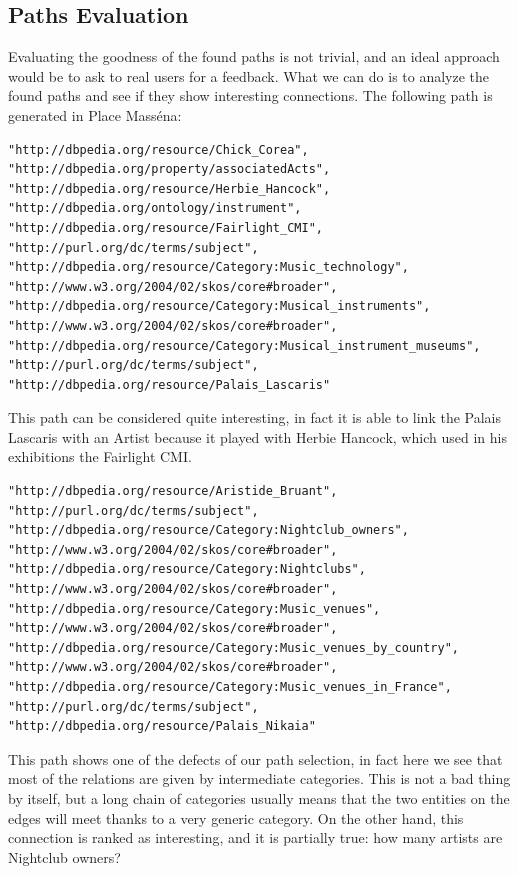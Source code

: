 \documentclass[paper=a4, fontsize=11pt]{scrartcl}
\begin{document}
\subsection{Paths Evaluation}
Evaluating the goodness of the found paths is not trivial, and an ideal approach would be to ask to real users for a feedback.
What we can do is to analyze the found paths and see if they show interesting connections.
The following path is generated in Place Masséna:
\begin{lstlisting}
"http://dbpedia.org/resource/Chick_Corea", 
"http://dbpedia.org/property/associatedActs", 
"http://dbpedia.org/resource/Herbie_Hancock", 
"http://dbpedia.org/ontology/instrument", 
"http://dbpedia.org/resource/Fairlight_CMI", 
"http://purl.org/dc/terms/subject", 
"http://dbpedia.org/resource/Category:Music_technology", 
"http://www.w3.org/2004/02/skos/core#broader", 
"http://dbpedia.org/resource/Category:Musical_instruments", 
"http://www.w3.org/2004/02/skos/core#broader",       
"http://dbpedia.org/resource/Category:Musical_instrument_museums", 
"http://purl.org/dc/terms/subject", 
"http://dbpedia.org/resource/Palais_Lascaris"
\end{lstlisting}
This path can be considered quite interesting, in fact it is able to link the Palais Lascaris with an Artist because it played with Herbie Hancock, which used in his exhibitions the Fairlight CMI.
\begin{lstlisting}
"http://dbpedia.org/resource/Aristide_Bruant", 
"http://purl.org/dc/terms/subject", 
"http://dbpedia.org/resource/Category:Nightclub_owners", 
"http://www.w3.org/2004/02/skos/core#broader", 
"http://dbpedia.org/resource/Category:Nightclubs", 
"http://www.w3.org/2004/02/skos/core#broader", 
"http://dbpedia.org/resource/Category:Music_venues", 
"http://www.w3.org/2004/02/skos/core#broader", 
"http://dbpedia.org/resource/Category:Music_venues_by_country", 
"http://www.w3.org/2004/02/skos/core#broader", 
"http://dbpedia.org/resource/Category:Music_venues_in_France", 
"http://purl.org/dc/terms/subject", 
"http://dbpedia.org/resource/Palais_Nikaia"
\end{lstlisting}
This path shows one of the defects of our path selection, in fact here we see that most of the relations are given by intermediate categories. This is not a bad thing by itself, but a long chain of categories usually means that the two entities on the edges will meet thanks to a very generic category. On the other hand, this connection is ranked as interesting, and it is partially true: how many artists are Nightclub owners?
\end{document}
